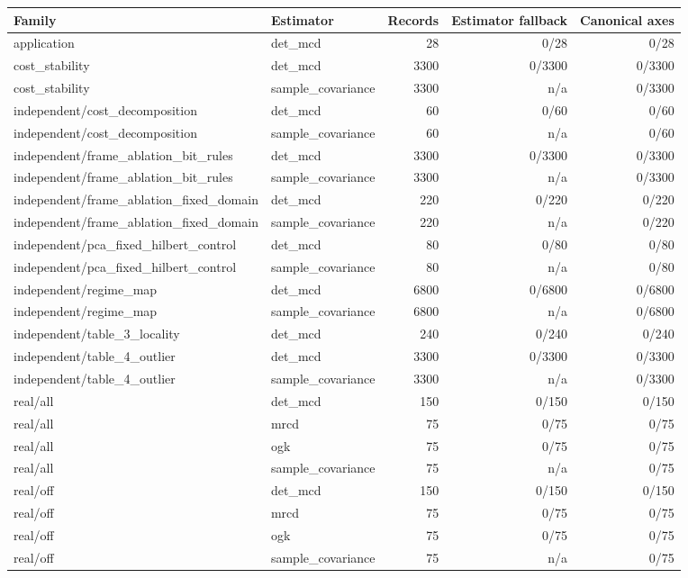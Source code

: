 \begin{tabular}{llrrr}
Family & Estimator & Records & Estimator fallback & Canonical axes \\
\hline
application & det\_mcd & 28 & 0/28 & 0/28 \\
cost\_stability & det\_mcd & 3300 & 0/3300 & 0/3300 \\
cost\_stability & sample\_covariance & 3300 & n/a & 0/3300 \\
independent/cost\_decomposition & det\_mcd & 60 & 0/60 & 0/60 \\
independent/cost\_decomposition & sample\_covariance & 60 & n/a & 0/60 \\
independent/frame\_ablation\_bit\_rules & det\_mcd & 3300 & 0/3300 & 0/3300 \\
independent/frame\_ablation\_bit\_rules & sample\_covariance & 3300 & n/a & 0/3300 \\
independent/frame\_ablation\_fixed\_domain & det\_mcd & 220 & 0/220 & 0/220 \\
independent/frame\_ablation\_fixed\_domain & sample\_covariance & 220 & n/a & 0/220 \\
independent/pca\_fixed\_hilbert\_control & det\_mcd & 80 & 0/80 & 0/80 \\
independent/pca\_fixed\_hilbert\_control & sample\_covariance & 80 & n/a & 0/80 \\
independent/regime\_map & det\_mcd & 6800 & 0/6800 & 0/6800 \\
independent/regime\_map & sample\_covariance & 6800 & n/a & 0/6800 \\
independent/table\_3\_locality & det\_mcd & 240 & 0/240 & 0/240 \\
independent/table\_4\_outlier & det\_mcd & 3300 & 0/3300 & 0/3300 \\
independent/table\_4\_outlier & sample\_covariance & 3300 & n/a & 0/3300 \\
real/all & det\_mcd & 150 & 0/150 & 0/150 \\
real/all & mrcd & 75 & 0/75 & 0/75 \\
real/all & ogk & 75 & 0/75 & 0/75 \\
real/all & sample\_covariance & 75 & n/a & 0/75 \\
real/off & det\_mcd & 150 & 0/150 & 0/150 \\
real/off & mrcd & 75 & 0/75 & 0/75 \\
real/off & ogk & 75 & 0/75 & 0/75 \\
real/off & sample\_covariance & 75 & n/a & 0/75 \\

\end{tabular}
